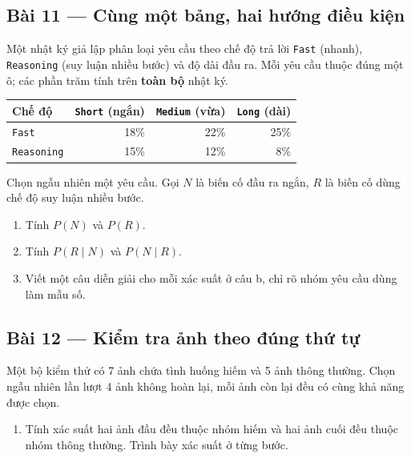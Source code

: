 \documentclass[11pt,a4paper]{article}
\begin{document}
\noindent\begin{minipage}{\linewidth}
\subsection*{Bài 11 --- Cùng một bảng, hai hướng điều kiện}

Một nhật ký giả lập phân loại yêu cầu theo chế độ trả lời \texttt{Fast} (nhanh), \texttt{Reasoning} (suy luận nhiều bước) và độ dài đầu ra. Mỗi yêu cầu thuộc đúng một ô; các phần trăm tính trên \textbf{toàn bộ} nhật ký.
\begin{center}\renewcommand{\arraystretch}{1.2}
\begin{tabular}{lrrr}\toprule
Chế độ & \texttt{Short} (ngắn)&\texttt{Medium} (vừa)&\texttt{Long} (dài)\\\midrule
\texttt{Fast}&18\%&22\%&25\%\\
\texttt{Reasoning}&15\%&12\%&8\%\\\bottomrule
\end{tabular}\end{center}
Chọn ngẫu nhiên một yêu cầu. Gọi \(N\) là biến cố đầu ra ngắn, \(R\) là biến cố dùng chế độ suy luận nhiều bước.

\begin{enumerate}[label=\alph*)]
\item Tính \(P(N)\) và \(P(R)\).
\item Tính \(P(R\mid N)\) và \(P(N\mid R)\).
\item Viết một câu diễn giải cho mỗi xác suất ở câu b, chỉ rõ nhóm yêu cầu dùng làm mẫu số.
\end{enumerate}

\end{minipage}\par

\par\medskip

\noindent\begin{minipage}{\linewidth}
\subsection*{Bài 12 --- Kiểm tra ảnh theo đúng thứ tự}

Một bộ kiểm thử có 7 ảnh chứa tình huống hiếm và 5 ảnh thông thường. Chọn ngẫu nhiên lần lượt 4 ảnh không hoàn lại, mỗi ảnh còn lại đều có cùng khả năng được chọn.

\begin{enumerate}[label=\alph*)]
\item Tính xác suất hai ảnh đầu đều thuộc nhóm hiếm và hai ảnh cuối đều thuộc nhóm thông thường. Trình bày xác suất ở từng bước.
\end{enumerate}

\end{minipage}\par
\end{document}
